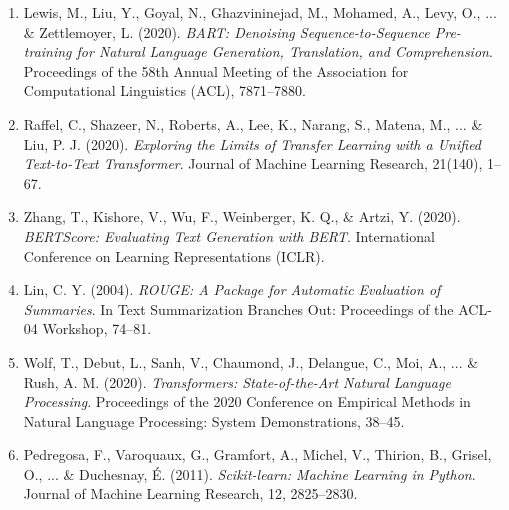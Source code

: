 \documentclass[11pt]{article}
\begin{document}
\begin{enumerate}
    \item Lewis, M., Liu, Y., Goyal, N., Ghazvininejad, M., Mohamed, A., Levy, O., ... \& Zettlemoyer, L. (2020).  
    \textit{BART: Denoising Sequence-to-Sequence Pre-training for Natural Language Generation, Translation, and Comprehension}.  
    Proceedings of the 58th Annual Meeting of the Association for Computational Linguistics (ACL), 7871–7880.

    \item Raffel, C., Shazeer, N., Roberts, A., Lee, K., Narang, S., Matena, M., ... \& Liu, P. J. (2020).  
    \textit{Exploring the Limits of Transfer Learning with a Unified Text-to-Text Transformer}.  
    Journal of Machine Learning Research, 21(140), 1–67.

    \item Zhang, T., Kishore, V., Wu, F., Weinberger, K. Q., \& Artzi, Y. (2020).  
    \textit{BERTScore: Evaluating Text Generation with BERT}.  
    International Conference on Learning Representations (ICLR).

    \item Lin, C. Y. (2004).  
    \textit{ROUGE: A Package for Automatic Evaluation of Summaries}.  
    In Text Summarization Branches Out: Proceedings of the ACL-04 Workshop, 74–81.

    \item Wolf, T., Debut, L., Sanh, V., Chaumond, J., Delangue, C., Moi, A., ... \& Rush, A. M. (2020).  
    \textit{Transformers: State-of-the-Art Natural Language Processing}.  
    Proceedings of the 2020 Conference on Empirical Methods in Natural Language Processing: System Demonstrations, 38–45.

    \item Pedregosa, F., Varoquaux, G., Gramfort, A., Michel, V., Thirion, B., Grisel, O., ... \& Duchesnay, É. (2011).  
    \textit{Scikit-learn: Machine Learning in Python}.  
    Journal of Machine Learning Research, 12, 2825–2830.
\end{enumerate}
\end{document}
